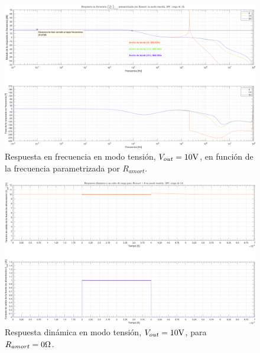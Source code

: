 \clearpage

\begin{figure}[H] %
\begin{center}
\includegraphics[width=1.1 \textwidth, angle=90]{./img/plots/rf/power_supply_RAMORT_RF_Modo1.png}
\caption{\label{fig:fig_power_supply_RAMORT_RF_Modo1}\footnotesize{Respuesta en frecuencia en modo tensión, $V_{out} = 10 \si[per-mode=symbol]{\volt}$, en función de la frecuencia parametrizada por $R_{amort}$.}}
\end{center}
\end{figure}

\clearpage

\begin{figure}[H] %
\begin{center}
\includegraphics[width=1.1 \textwidth, angle=90]{./img/plots/dynamic/power_supply_RAMORT_0_STEP_Modo1.png}
\caption{\label{fig:fig_power_supply_RAMORT_STEP_0_Modo1}\footnotesize{Respuesta dinámica en modo tensión, $V_{out} = 10 \si[per-mode=symbol]{\volt}$, para $R_{amort} = 0 \si[per-mode=symbol]{\ohm} $.}}
\end{center}
\end{figure}


